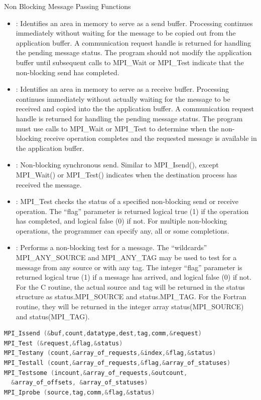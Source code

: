 \documentclass[10pt,t]{beamer}
\begin{document}
\begin{frame}{Non Blocking Message Passing Functions}
  \begin{itemize}
    \item {}: Identifies an area in memory to serve as a send buffer. Processing continues immediately without waiting for the message to be copied out from the application buffer. A communication request handle is returned for handling the pending message status. The program should not modify the application buffer until subsequent calls to MPI\_Wait or MPI\_Test indicate that the non-blocking send has completed.
    \item {}: Identifies an area in memory to serve as a receive buffer. Processing continues immediately without actually waiting for the message to be received and copied into the the application buffer. A communication request handle is returned for handling the pending message status. The program must use calls to MPI\_Wait or MPI\_Test to determine when the non-blocking receive operation completes and the requested message is available in the application buffer.
    \item {}: Non-blocking synchronous send. Similar to MPI\_Isend(), except MPI\_Wait() or MPI\_Test() indicates when the destination process has received the message.
    \item {}: MPI\_Test checks the status of a specified non-blocking send or receive operation. The “flag” parameter is returned logical true (1) if the operation has completed, and logical false (0) if not. For multiple non-blocking operations, the programmer can specify any, all or some completions.
    \item {}: Performs a non-blocking test for a message. The “wildcards” MPI\_ANY\_SOURCE and MPI\_ANY\_TAG may be used to test for a message from any source or with any tag. The integer “flag” parameter is returned logical true (1) if a message has arrived, and logical false (0) if not. For the C routine, the actual source and tag will be returned in the status structure as status.MPI\_SOURCE and status.MPI\_TAG. For the Fortran routine, they will be returned in the integer array status(MPI\_SOURCE) and status(MPI\_TAG).
  \end{itemize}
  \framebreak
  \begin{lstlisting}[basicstyle=\scriptsize\ttfamily,language=C]
MPI_Issend (&buf,count,datatype,dest,tag,comm,&request)
MPI_Test (&request,&flag,&status)
MPI_Testany (count,&array_of_requests,&index,&flag,&status)
MPI_Testall (count,&array_of_requests,&flag,&array_of_statuses)
MPI_Testsome (incount,&array_of_requests,&outcount,
  &array_of_offsets, &array_of_statuses)
MPI_Iprobe (source,tag,comm,&flag,&status)
  \end{lstlisting}


\end{frame}
\end{document}
